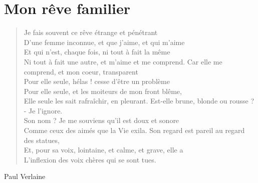﻿\documentclass[12pt, a4paper]{report}
\begin{document}
        \section*{Mon rêve familier}
        \beginnumbering
        \pstart
        \begin{verse}
        Je fais souvent ce rêve étrange et pénétrant\\
D'une femme inconnue, et que j'aime, et qui m'aime\\
Et qui n'est, chaque fois, ni tout à fait la même\\
Ni tout à fait une autre, et m'aime et me comprend.
Car elle me comprend, et mon coeur, transparent\\
Pour elle seule, hélas ! cesse d'être un problème\\
Pour elle seule, et les moiteurs de mon front blême,\\
Elle seule les sait rafraîchir, en pleurant.
Est-elle brune, blonde ou rousse ? - Je l'ignore.\\
Son nom ? Je me souviens qu'il est doux et sonore\\
Comme ceux des aimés que la Vie exila.
Son regard est pareil au regard des statues,\\
Et, pour sa voix, lointaine, et calme, et grave, elle a\\
L'inflexion des voix chères qui se sont tues.

        \end{verse}
        \pend
        \endnumbering
        \begin{flushright}
        Paul Verlaine
        \end{flushright}
        
\end{document}
